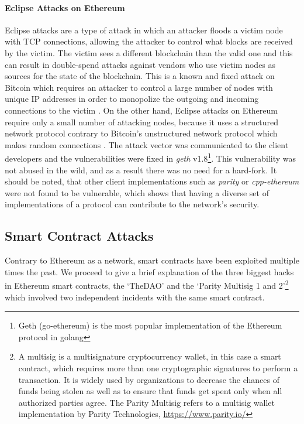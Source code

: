 \paragraph{Eclipse Attacks on Ethereum}
Eclipse attacks are a type of attack in which an attacker floods a victim node with TCP connections, allowing the attacker to control what blocks are received by the victim. The victim sees a different blockchain than the valid one and this can result in double-spend attacks against vendors who use victim nodes as sources for the state of the blockchain. This is a known and fixed attack on Bitcoin which requires an attacker to control a large number of nodes with unique IP addresses in order to monopolize the outgoing and incoming connections to the victim \cite{cryptoeprint:2015:263}. On the other hand, Eclipse attacks on Ethereum require only a small number of attacking nodes, because it uses a structured network protocol contrary to Bitcoin's unstructured network protocol which makes random connections \cite{cryptoeprint:2018:236}. The attack vector was communicated to the client developers and the vulnerabilities were fixed in \textit{geth} v1.8\footnote{Geth (go-ethereum) is the most popular implementation of the Ethereum protocol in golang}. This vulnerability was not abused in the wild, and as a result there was no need for a hard-fork. It should be noted, that other client implementations such as \textit{parity} or \textit{cpp-ethereum} were not found to be vulnerable, which shows that having a diverse set of implementations of a protocol can contribute to the network's security.

\subsection{Smart Contract Attacks}
Contrary to Ethereum as a network, smart contracts have been exploited multiple times the past. We proceed to give a brief explanation of the three biggest hacks in Ethereum smart contracts, the `TheDAO' and the `Parity Multisig 1 and 2'\footnote{A multisig is a multisignature cryptocurrency wallet, in this case a smart contract, which requires more than one cryptographic signatures to perform a transaction. It is widely used by organizations to decrease the chances of funds being stolen as well as to ensure that funds get spent only when all authorized parties agree. The Parity Multisig refers to a multisig wallet implementation by Parity Technologies, \url{https://www.parity.io/}} which involved two independent incidents with the same smart contract.


